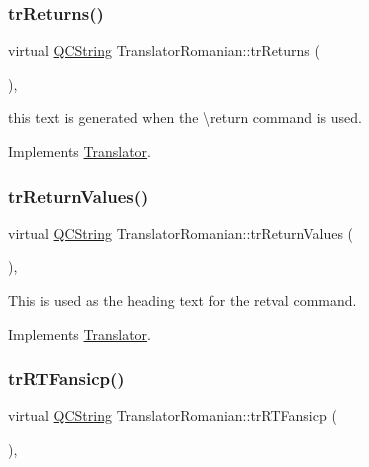 \subsubsection{\texorpdfstring{trReturns()}{trReturns()}}
{\footnotesize\ttfamily virtual \mbox{\hyperlink{class_q_c_string}{Q\+C\+String}} Translator\+Romanian\+::tr\+Returns (\begin{DoxyParamCaption}{ }\end{DoxyParamCaption})\hspace{0.3cm}{\ttfamily [inline]}, {\ttfamily [virtual]}}

this text is generated when the \textbackslash{}return command is used. 

Implements \mbox{\hyperlink{class_translator}{Translator}}.

\mbox{\label{class_translator_romanian_af856c71f02da4dcfaea3ac263aea48f6}} 
\subsubsection{\texorpdfstring{trReturnValues()}{trReturnValues()}}
{\footnotesize\ttfamily virtual \mbox{\hyperlink{class_q_c_string}{Q\+C\+String}} Translator\+Romanian\+::tr\+Return\+Values (\begin{DoxyParamCaption}{ }\end{DoxyParamCaption})\hspace{0.3cm}{\ttfamily [inline]}, {\ttfamily [virtual]}}

This is used as the heading text for the retval command. 

Implements \mbox{\hyperlink{class_translator}{Translator}}.

\mbox{\label{class_translator_romanian_ab7c503188161175b30f783b9c15f924f}} 
\subsubsection{\texorpdfstring{trRTFansicp()}{trRTFansicp()}}
{\footnotesize\ttfamily virtual \mbox{\hyperlink{class_q_c_string}{Q\+C\+String}} Translator\+Romanian\+::tr\+R\+T\+Fansicp (\begin{DoxyParamCaption}{ }\end{DoxyParamCaption})\hspace{0.3cm}{\ttfamily [inline]}, {\ttfamily [virtual]}}

